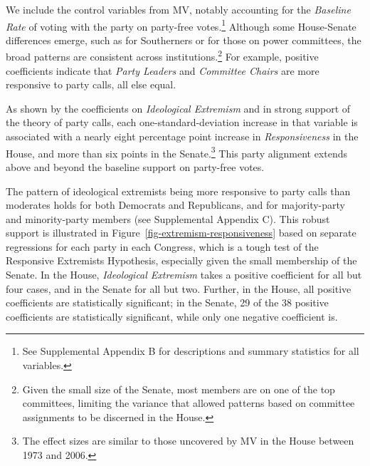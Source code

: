 \documentclass[12pt]{article}
\begin{document}
We include the control variables from MV, notably accounting for the \textit{Baseline Rate} of voting with the party on party-free votes.\footnote{\doublespacing\normalsize See Supplemental Appendix B for descriptions and summary statistics for all variables.}  Although some House-Senate differences emerge, such as for Southerners or for those on power committees, the broad patterns are consistent across institutions.\footnote{\doublespacing\normalsize Given the small size of the Senate, most members are on one of the top committees, limiting the variance that allowed patterns based on committee assignments to be discerned in the House.}  For example, positive coefficients indicate that \textit{Party Leaders} and \textit{Committee Chairs} are more responsive to party calls, all else equal.

As shown by the coefficients on \textit{Ideological Extremism} and in strong support of the theory of party calls, each one-standard-deviation increase in that variable is associated with a nearly eight percentage point increase in \textit{Responsiveness} in the House, and more than six points in the Senate.\footnote{\doublespacing\normalsize The effect sizes are similar to those uncovered by MV in the House between 1973 and 2006.}  This party alignment extends above and beyond the baseline support on party-free votes.

The pattern of ideological extremists being more responsive to party calls than moderates holds for both Democrats and Republicans, and for majority-party and minority-party members (see Supplemental Appendix C). This robust support is illustrated in Figure~\ref{fig-extremism-responsiveness} based on separate regressions for each party in each Congress, which is a tough test of the Responsive Extremists Hypothesis, especially given the small membership of the Senate. In the House, \textit{Ideological Extremism} takes a positive coefficient for all but four cases, and in the Senate for all but two. Further, in the House, all positive coefficients are statistically significant; in the Senate, 29 of the 38 positive coefficients are statistically significant, while only one negative coefficient is.
\end{document}
